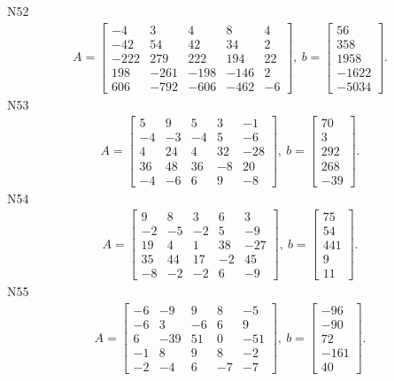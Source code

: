 \documentclass[11pt]{report}
\begin{document}
N52
\begin{align*}
 A = \left[\begin{matrix}-4 & 3 & 4 & 8 & 4\\-42 & 54 & 42 & 34 & 2\\-222 & 279 & 222 & 194 & 22\\198 & -261 & -198 & -146 & 2\\606 & -792 & -606 & -462 & -6\end{matrix}\right],
\ b = \left[\begin{matrix}56\\358\\1958\\-1622\\-5034\end{matrix}\right]. 
 \end{align*}
N53
\begin{align*}
 A = \left[\begin{matrix}5 & 9 & 5 & 3 & -1\\-4 & -3 & -4 & 5 & -6\\4 & 24 & 4 & 32 & -28\\36 & 48 & 36 & -8 & 20\\-4 & -6 & 6 & 9 & -8\end{matrix}\right],
\ b = \left[\begin{matrix}70\\3\\292\\268\\-39\end{matrix}\right]. 
 \end{align*}
N54
\begin{align*}
 A = \left[\begin{matrix}9 & 8 & 3 & 6 & 3\\-2 & -5 & -2 & 5 & -9\\19 & 4 & 1 & 38 & -27\\35 & 44 & 17 & -2 & 45\\-8 & -2 & -2 & 6 & -9\end{matrix}\right],
\ b = \left[\begin{matrix}75\\54\\441\\9\\11\end{matrix}\right]. 
 \end{align*}
N55
\begin{align*}
 A = \left[\begin{matrix}-6 & -9 & 9 & 8 & -5\\-6 & 3 & -6 & 6 & 9\\6 & -39 & 51 & 0 & -51\\-1 & 8 & 9 & 8 & -2\\-2 & -4 & 6 & -7 & -7\end{matrix}\right],
\ b = \left[\begin{matrix}-96\\-90\\72\\-161\\40\end{matrix}\right]. 
 \end{align*}
\end{document}
